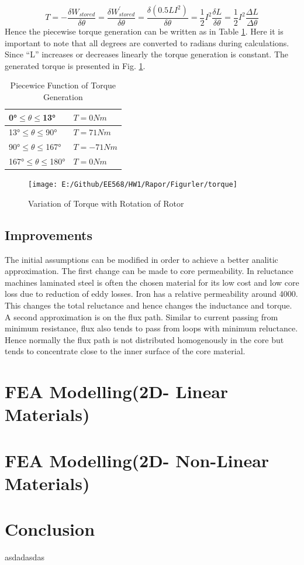 \documentclass{article}
\begin{document}
\begin{equation}
T=-\frac{\delta W_{stored}}{\delta\theta}=\frac{\delta W^{'}_{stored}}{\delta\theta}=\frac{\delta(0.5LI^2)}{\delta\theta}=\frac{1}{2}I^2\frac{\delta L}{\delta\theta}=\frac{1}{2}I^2\frac{\Delta L}{\Delta\theta}
\label{torqueformula}
\end{equation}
Hence the piecewise torque generation can be written as in Table \ref{torquetable}. Here it is important to note that all degrees are converted to radians during calculations. Since \enquote{L} increases or decreases linearly the torque generation is constant. The generated torque is presented in Fig. \ref{fig:torqueanalitic}.
	\begin{table}[h!]
	\centering
	\caption{Piecewice Function of Torque Generation}
	\label{torquetable}
	\begin{tabular}{ll}		
		\hline
		\ang{0}$\leq$$\theta$$\leq$\ang{13}	& $T=0 Nm$ \\ \hline
		\ang{13}$\leq$$\theta$$\leq$\ang{90}	& $T=71 Nm$ \\ \hline
		\ang{90}$\leq$$\theta$$\leq$\ang{167}	& $T=-71 Nm$ \\ \hline
		\ang{167}$\leq$$\theta$$\leq$\ang{180}	& $T=0 Nm$ \\ \hline
	\end{tabular}	
\end{table}
\begin{figure}[H]
	\centering
	\texttt{[image: E:/Github/EE568/HW1/Rapor/Figurler/torque]}
	\caption{Variation of Torque with Rotation of Rotor}
	\label{fig:torqueanalitic}
\end{figure}

\subsection{Improvements}
The initial assumptions can be modified in order to achieve a better analitic approximation. The first change can be made to core permeability. In reluctance machines laminated steel is often the chosen material for its low cost and low core loss due to reduction of eddy losses. Iron has a relative permeability around 4000. This changes the total reluctance and hence changes the inductance and torque. A second approximation is on the flux path. Similar to current passing from minimum resistance, flux also tends to pass from loops with minimum reluctance. Hence normally the flux path is not distributed homogenously in the core but tends to concentrate close to the inner surface of the core material. 

\section{FEA Modelling(2D- Linear Materials)}

\section{FEA Modelling(2D- Non-Linear Materials)}

\section{Conclusion}

asdadasdas
\end{document}
